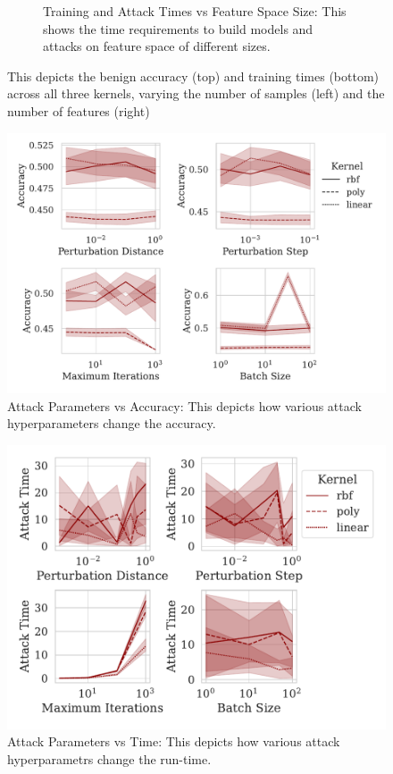 \documentclass[fonts]{icst}
\begin{document}
\begin{figure}
\begin{subfigure}{.45\textwidth}
        \caption{Training and Attack Times vs Feature Space Size: This shows the time requirements to build models and attacks on feature space of different sizes. 
        }
        \label{fig:features_time}
    \end{subfigure}
    \label{fig:model}
    \caption{This depicts the benign accuracy (top) and training times (bottom) across all three kernels, varying the number of samples (left) and the number of features (right)}
\end{figure}

\begin{figure}[!htb]
  \centering
  \includegraphics[width=.75\textwidth]{./generated/accuracy_vs_attack_parameters.pdf}
   \caption{Attack Parameters vs Accuracy: This depicts how various attack hyperparameters change the accuracy.
   }
   \label{fig:attack_accuracy}
\end{figure}


\begin{figure}
    \centering
    \includegraphics[width=.75\textwidth]{./generated/train_time_vs_attack_parameters.pdf}
    \caption{Attack Parameters vs Time: This depicts how various attack hyperparametrs change the run-time.}
    \label{fig:attack_time}
\end{figure}
\end{document}
